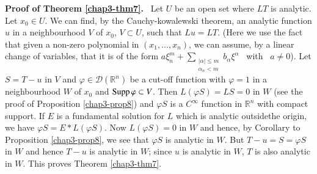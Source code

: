 \noindent
{\bf Proof of Theorem \ref{chap3-thm7}.}~
Let $U$ be an open set where $LT$ is analytic. Let $x_{0}\in U$. We
can find, by the Cauchy-kowalewski theorem, an analytic function $u$
in a neighbourhood $V$ of $x_{0}$, $V\subset U$, such that
$Lu=LT$. (Here we use the fact that given a non-zero polynomial in
$(x_{1},\ldots,x_{n})$, we can assume, by a linear change of
variables, that it is of the form
$a\xi^{m}_{n}+\sum\limits_{\substack{|\alpha|\leq
    m\\ \alpha_{n}<m}}b_{\alpha}\xi^{\alpha}$ \ with \ $a\neq 0$). Let
$S=T-u$ in $V$ and $\varphi\in \mathcal{D}(\mathbb{R}^{n})$ be a
cut-off function with $\varphi=1$ in a neighbourhood $W$ of $x_{0}$
and $\operatorname{Supp} \varphi \subset V$. Then $L(\varphi S)=LS=0$ in $W$ (see
the proof of Proposition \ref{chap3-prop8}) and $\varphi S$ is a
$C^{\infty}$ function in $\mathbb{R}^{n}$ with compact support. If $E$
is a fundamental solution for $L$ which is analytic
outside\pageoriginale the origin, we have $\varphi S=E\ast L(\varphi
S)$. Now $L(\varphi S)=0$ in $W$ and hence, by Corollary to
Proposition \ref{chap3-prop8}, we see that $\varphi S$ is analytic in
$W$. But $T-u=S=\varphi S$ in $W$ and hence $T-u$ is analytic in $W$;
since $u$ is analytic in $W$, $T$ is also analytic in $W$. This proves
Theorem \ref{chap3-thm7}.
